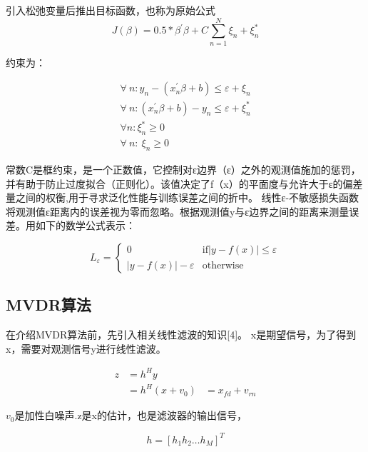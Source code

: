 引入松弛变量后推出目标函数，也称为原始公式
\begin{equation}
J\left(\beta\right)=0.5\ast\beta^\prime\beta+C\sum_{n=1}^{N}{\xi_n+\xi_n^\ast}
\end{equation}

约束为：

\begin{equation}
\begin{gathered}
\forall\ n:y_n-\left(x_n^\prime\beta+b\right)\le\varepsilon+\xi_n\\
\forall\ n:\left(x_n^\prime\beta+b\right)-y_n\le\varepsilon+\xi_n^\ast\\
{\forall n:\xi}_n^\ast\geq0\\
\forall\ n:\ \xi_n\geq0
\end{gathered}
\end{equation}

常数C是框约束，是一个正数值，它控制对ε边界（ε）之外的观测值施加的惩罚，并有助于防止过度拟合（正则化）。该值决定了f（x）的平面度与允许大于ε的偏差量之间的权衡,用于寻求泛化性能与训练误差之间的折中。
线性ε-不敏感损失函数将观测值ε距离内的误差视为零而忽略。根据观测值y与ε边界之间的距离来测量误差。用如下的数学公式表示：

\begin{equation}
L_\varepsilon= 
\begin{cases}
0&               \text{if} |y-f(x)|\leq \varepsilon\\
|y-f(x)|-\varepsilon&       \text{otherwise}
\end{cases}
\end{equation}

\subsection{MVDR算法}
在介绍MVDR算法前，先引入相关线性滤波的知识[4]。
x是期望信号，为了得到x，需要对观测信号y进行线性滤波。

\begin{equation}
\begin{aligned}
z&=h^Hy\\
&= h^H\left(x+v_0\right)
&=x_{fd}+v_{rn}
\end{aligned}
\end{equation}

$v_0$是加性白噪声.z是x的估计，也是滤波器的输出信号，

\begin{equation}
h=\left[h_1h_2\ldots h_M\right]^T
\end{equation}

